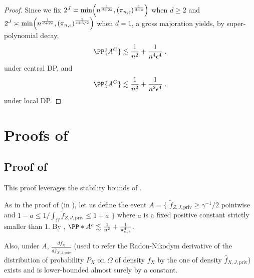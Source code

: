 \documentclass{article}
\newcommand{\1}{\mathds{1}}
\DeclarePairedDelimiter{\paren}{\lparen}{\rparen}
\theoremstyle{plain}
\theoremstyle{definition}
\theoremstyle{remark}
\begin{document}
\begin{proof}
Since we fix $2^J \asymp \min \paren*{n^{\frac{1}{d + 2s}}, (\pi_{n,\epsilon})^{\frac{1}{d+s}}}$ when $d \geq 2$ and $2^J \asymp \min \paren*{n^{\frac{1}{d + 2s}}, (\pi_{n,\epsilon})^{\frac{1}{s + 3/2}}}$ when $d=1$, a gross majoration yields, by super-polynomial decay, 
\begin{equation}
    \PP{A^C} \lesssim \frac{1}{n^2} + \frac{1}{n^4 \epsilon^4} \;.
\end{equation}
under central DP, 
and
\begin{equation}
    \PP{A^C} \lesssim \frac{1}{n^2} + \frac{1}{n^2 \epsilon^4} \;.
\end{equation}
under local DP.
\end{proof}

\section{Proofs of }
\label{proofs_of_sec:transport_map_estimation}


\subsection{Proof of }
\label{proof_of_th:main_rate}

This proof leverages the stability bounds of \cite{balakrishnan2025stabilityboundssmoothoptimal}.

As in the proof of  (in ), let us define the event  $A = \bigl\{ $ $ \tilde{f}_{Z, J, \textrm{priv} } \geq \gamma^{-1}/2 $ pointwise  and $1 - a \leq  1 /\int_{\Omega} \tilde{f}_{Z, J, \textrm{priv} } \leq 1 + a$  $\bigr\}$ where $a$ is a fixed positive constant strictly smaller than $1$.
By , $\PP*{A^c} \lesssim \frac{1}{n^2} + \frac{1}{\pi_{n, \epsilon}^4}$.

Also, under $A$, $\frac{d f_X}{d \hat{f}_{X, J, \textrm{priv} }}$ (used to refer the Radon-Nikodym derivative of the distribution of probability $P_X$ on $\Omega$ of density $f_X$ by the one of density $\hat{f}_{X, J, \textrm{priv} }$) exists and is lower-bounded almost surely by a constant. 
\end{document}
